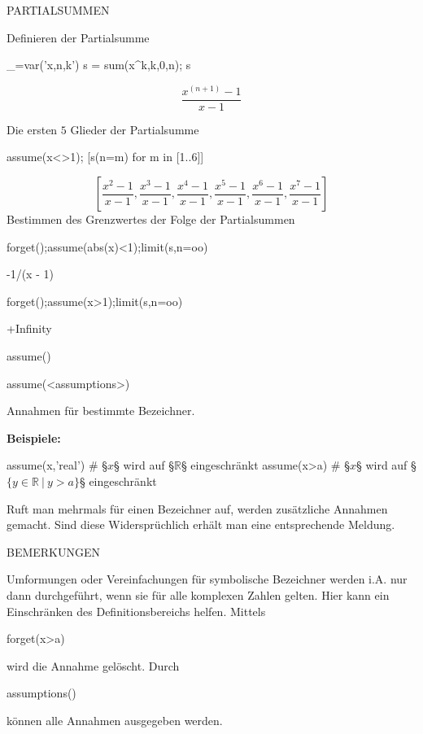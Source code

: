\documentclass[fontsize=12pt,paper=a4,twoside,bibtotoc,idxtotoc,
liststotoc,pagesize,BCOR1.2cm,DIV15,chapterprefix,pagesize=pdftex]{scrbook}
\theoremstyle{plain}
\theoremstyle{definition}
\theoremstyle{remark}
\begin{document}
PARTIALSUMMEN


 Definieren der Partialsumme
\begin{sagein}
_=var('x,n,k')
s = sum(x^k,k,0,n); s
\end{sagein}
{\color{blue}\[\frac{x^{{\left(n + 1\right)}} - 1}{x - 1}\]}

 Die ersten $5$ Glieder der Partialsumme
\begin{sagein}
assume(x<>1); [s(n=m) for m in [1..6]]
\end{sagein}
{\color{blue}\[\left[\frac{x^{2} - 1}{x - 1}, \frac{x^{3} - 1}{x - 1}, \frac{x^{4} - 1}{x - 1}, \frac{x^{5} - 1}{x - 1}, \frac{x^{6} - 1}{x - 1}, \frac{x^{7} - 1}{x - 1}\right] \]}
 Bestimmen des Grenzwertes der Folge der Partialsummen
\begin{sagein}
forget();assume(abs(x)<1);limit(s,n=oo)
\end{sagein}
\begin{sage}
-1/(x - 1)
\end{sage}
\begin{sagein}
forget();assume(x>1);limit(s,n=oo)
\end{sagein}
\begin{sage}
+Infinity
\end{sage}
 

assume()

\begin{sagein}
assume(<assumptions>)
\end{sagein}
Annahmen für bestimmte Bezeichner.

\textbf{Beispiele:}
\begin{sagein}
assume(x,'real') # §$x$§ wird auf §$\mathbb{R}$§ eingeschränkt
assume(x>a) # §$x$§ wird auf  §$\{y \in \mathbb{R}\ |\ y>a\}$§ eingeschränkt
\end{sagein}

Ruft man  mehrmals für einen Bezeichner auf, werden zusätzliche Annahmen gemacht. Sind diese
Widersprüchlich erhält man eine entsprechende Meldung.

BEMERKUNGEN


 Umformungen oder Vereinfachungen für symbolische Bezeichner
werden i.A. nur dann durchgeführt,
wenn sie für alle komplexen Zahlen gelten. Hier kann ein Einschränken
des Definitionsbereichs helfen.
 Mittels 
\begin{sagein}
forget(x>a)
\end{sagein}
wird die Annahme  gelöscht.
 Durch 
\begin{sagein}
assumptions() 
\end{sagein}
können alle Annahmen ausgegeben werden.
\end{document}

